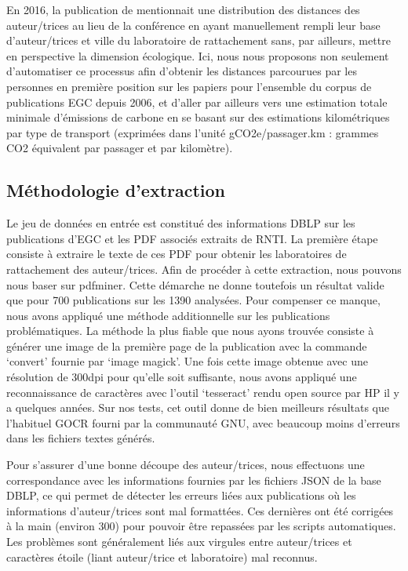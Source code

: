 \documentclass[a4paper,french]{rnti}
\begin{document}
En 2016, la publication de \cite{kergosien16egc} mentionnait une 
distribution des distances des auteur/trices au lieu de la conférence en 
ayant manuellement rempli leur base d'auteur/trices et ville du 
laboratoire de rattachement sans, par ailleurs, mettre en perspective la 
dimension écologique. Ici, nous nous proposons non seulement d'automatiser 
ce processus afin d'obtenir les distances parcourues par les personnes en 
première position sur les papiers pour l'ensemble du corpus de 
publications EGC depuis 2006, et d'aller par ailleurs vers une estimation 
totale minimale d'émissions de carbone en se basant sur des estimations 
kilométriques par type de transport (exprimées dans l'unité 
gCO2e/passager.km : grammes CO2 équivalent par passager et par kilomètre).



\subsection{Méthodologie d'extraction}\label{sec: methodologie}

Le jeu de données en entrée est constitué des informations DBLP sur les 
publications d'EGC et les PDF associés extraits de RNTI. La première étape 
consiste à extraire le texte de ces PDF pour obtenir les laboratoires de 
rattachement des auteur/trices. Afin de procéder à cette extraction, nous 
pouvons nous baser sur pdfminer. Cette démarche ne donne toutefois un 
résultat valide que pour 700 publications sur les 1390 analysées. Pour 
compenser ce manque, nous avons appliqué une méthode additionnelle sur les 
publications
problématiques. La méthode la plus fiable que nous ayons trouvée consiste 
à générer une image
de la première page de la publication avec la commande `convert' fournie 
par `image magick'.
Une fois cette image obtenue avec une résolution de 300dpi pour qu'elle 
soit suffisante, nous avons appliqué une reconnaissance de caractères avec 
l'outil `tesseract' rendu open source par HP il y a quelques années.
Sur nos tests, cet outil donne de bien meilleurs résultats que l'habituel 
GOCR fourni
par la communauté GNU, avec beaucoup moins d'erreurs dans les fichiers 
textes générés.

Pour s'assurer d'une bonne découpe des auteur/trices, nous effectuons une 
correspondance avec les informations fournies par les fichiers JSON de la 
base DBLP, ce qui permet de détecter les erreurs liées aux publications où 
les informations d'auteur/trices sont mal formattées. Ces dernières
ont été corrigées à la main (environ 300) pour pouvoir être repassées par 
les scripts automatiques. Les problèmes sont généralement liés aux 
virgules entre auteur/trices et caractères étoile (liant auteur/trice et 
laboratoire) mal reconnus.
\end{document}
